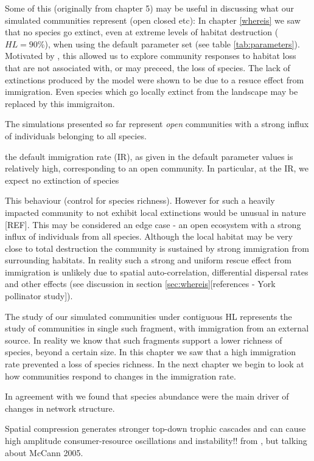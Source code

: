 Some of this (originally from chapter 5) may be useful in discussing what our simulated communities represent (open closed etc):
In chapter \ref{whereis} we saw that no species go extinct, even at extreme levels of habitat destruction ($HL=90\%$), when using the default parameter set (see table \ref{tab:parameters}). Motivated by \cite{tylianakis2007habitat}, this allowed us to explore community responses to habitat loss that are not associated with, or may preceed, the loss of species. The lack of extinctions produced by the model were shown to be due to a resuce effect from immigration. Even species which go locally extinct from the landscape may be replaced by this immigraiton.    

The simulations presented so far represent \emph{open} communities with a strong influx of individuals belonging to all species.

the default immigration rate (IR), as given in the default parameter values  is relatively high, corresponding to an open community. In particular, at the IR, we expect no extinction of species

This behaviour  (control for species richness). However for such a heavily impacted community to not exhibit local extinctions would be unusual in nature [REF]. This may be considered an edge case - an open ecosystem with a strong influx of individuals from all species. Although the local habitat may be very close to total destruction the community is sustained by strong immigration from surrounding habitats. In reality such a strong and uniform rescue effect from immigration is unlikely due to spatial auto-correlation, differential dispersal rates and other effects (see discussion in section \ref{sec:whereis}[references - York pollinator study]).

The study of our simulated communities under contiguous HL represents the study of communities in single such fragment, with immigration from an external source. In reality we know that such fragments support a lower richness of species, beyond a certain size. In this chapter we saw that a high immigration rate prevented a loss of species richness. In the next chapter we begin to look at how communities respond to changes in the immigration rate.


In agreement with \cite{spiesman2013habitat} we found that species abundance were the main driver of changes in network structure.

Spatial compression generates stronger top-down trophic cascades and can cause high amplitude consumer-resource oscillations and instability!! from \cite{gonzalez2011disentangled}, but talking about McCann 2005.

